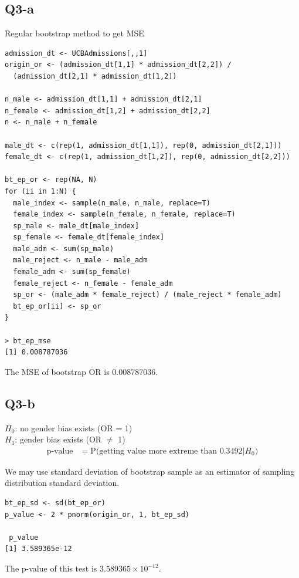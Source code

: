\documentclass[12pt,letterpaper]{article}
\begin{document}
\subsection*{Q3-a}
\noindent Regular bootstrap method to get MSE
\begin{verbatim}
admission_dt <- UCBAdmissions[,,1]
origin_or <- (admission_dt[1,1] * admission_dt[2,2]) / 
  (admission_dt[2,1] * admission_dt[1,2])

n_male <- admission_dt[1,1] + admission_dt[2,1]
n_female <- admission_dt[1,2] + admission_dt[2,2]
n <- n_male + n_female

male_dt <- c(rep(1, admission_dt[1,1]), rep(0, admission_dt[2,1]))
female_dt <- c(rep(1, admission_dt[1,2]), rep(0, admission_dt[2,2]))

bt_ep_or <- rep(NA, N)
for (ii in 1:N) {
  male_index <- sample(n_male, n_male, replace=T)
  female_index <- sample(n_female, n_female, replace=T)
  sp_male <- male_dt[male_index]
  sp_female <- female_dt[female_index]
  male_adm <- sum(sp_male)
  male_reject <- n_male - male_adm
  female_adm <- sum(sp_female)
  female_reject <- n_female - female_adm
  sp_or <- (male_adm * female_reject) / (male_reject * female_adm)
  bt_ep_or[ii] <- sp_or
}

> bt_ep_mse
[1] 0.008787036
\end{verbatim}

\noindent The MSE of bootstrap OR is 0.008787036.

\newpage
\subsection*{Q3-b}
\noindent $H_0$: no gender bias exists (OR = 1)\\
\noindent $H_1$: gender bias exists (OR $\neq$ 1)
\begin{align*}
\text{p-value} &= \text{P(getting value more extreme than 0.3492} | H_0)
\end{align*}

\noindent We may use standard deviation of bootstrap sample as an estimator of sampling distribution standard deviation. 

\begin{verbatim}
bt_ep_sd <- sd(bt_ep_or)
p_value <- 2 * pnorm(origin_or, 1, bt_ep_sd)

 p_value
[1] 3.589365e-12
\end{verbatim}

\noindent The p-value of this test is $3.589365 \times 10^{-12}$. \\
\end{document}
